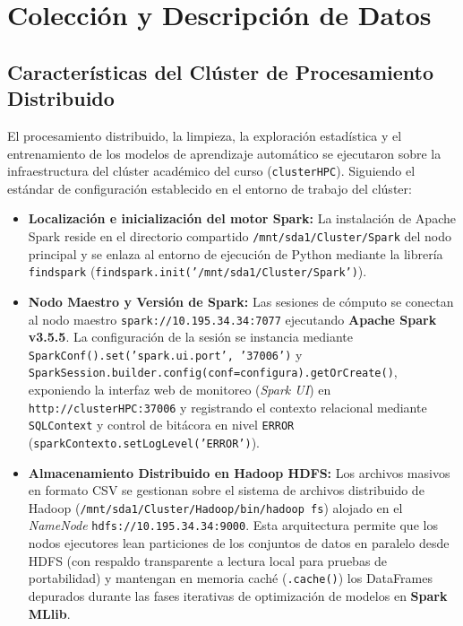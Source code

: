 \section{Colección y Descripción de Datos}
\label{sec:coleccion_descripcion}

\subsection{Características del Clúster de Procesamiento Distribuido}
\label{subsec:caracteristicas_cluster}

El procesamiento distribuido, la limpieza, la exploración estadística y el entrenamiento de los modelos de aprendizaje automático se ejecutaron sobre la infraestructura del clúster académico del curso (\texttt{clusterHPC}). Siguiendo el estándar de configuración establecido en el entorno de trabajo del clúster:

\begin{itemize}
    \item \textbf{Localización e inicialización del motor Spark:} La instalación de Apache Spark reside en el directorio compartido \texttt{/mnt/sda1/Cluster/Spark} del nodo principal y se enlaza al entorno de ejecución de Python mediante la librería \texttt{findspark} (\texttt{findspark.init('/mnt/sda1/Cluster/Spark')}).
    \item \textbf{Nodo Maestro y Versión de Spark:} Las sesiones de cómputo se conectan al nodo maestro \texttt{spark://10.195.34.34:7077} ejecutando \textbf{Apache Spark v3.5.5}. La configuración de la sesión se instancia mediante \texttt{SparkConf().set('spark.ui.port', '37006')} y \texttt{SparkSession.\allowbreak builder.\allowbreak config(conf=configura).\allowbreak getOrCreate()}, exponiendo la interfaz web de monitoreo (\textit{Spark UI}) en \texttt{http://clusterHPC:37006} y registrando el contexto relacional mediante \texttt{SQLContext} y control de bitácora en nivel \texttt{ERROR} (\texttt{sparkContexto.setLogLevel('ERROR')}).
    \item \textbf{Almacenamiento Distribuido en Hadoop HDFS:} Los archivos masivos en formato CSV se gestionan sobre el sistema de archivos distribuido de Hadoop (\texttt{/mnt/sda1/\allowbreak Cluster/Hadoop/\allowbreak bin/hadoop fs}) alojado en el \textit{NameNode} \texttt{hdfs://10.195.34.34:9000}. Esta arquitectura permite que los nodos ejecutores lean particiones de los conjuntos de datos en paralelo desde HDFS (con respaldo transparente a lectura local para pruebas de portabilidad) y mantengan en memoria caché (\texttt{.cache()}) los DataFrames depurados durante las fases iterativas de optimización de modelos en \textbf{Spark MLlib}.
\end{itemize}

